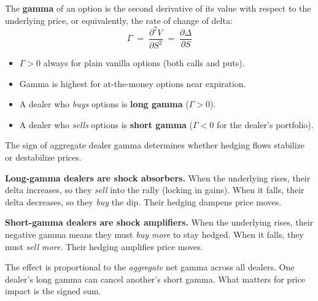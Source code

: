 \begin{definition}[Gamma]
The \textbf{gamma} of an option is the second derivative of its
value with respect to the underlying price, or equivalently, the
rate of change of delta:
\begin{equation}
\label{eq:gamma-def}
\Gamma \;=\; \frac{\partial^2 V}{\partial S^2}
  \;=\; \frac{\partial \Delta}{\partial S}
\end{equation}
\begin{itemize}[nosep]
  \item $\Gamma > 0$ always for plain vanilla options
        (both calls and puts).
  \item Gamma is highest for at-the-money options near expiration.
  \item A dealer who \emph{buys} options is \textbf{long gamma}
        ($\Gamma > 0$).
  \item A dealer who \emph{sells} options is \textbf{short gamma}
        ($\Gamma < 0$ for the dealer's portfolio).
\end{itemize}
\end{definition}

The sign of aggregate dealer gamma determines whether hedging flows
stabilize or destabilize prices.

\begin{intuition}
\textbf{Long-gamma dealers are shock absorbers.}  When the underlying
rises, their delta increases, so they \emph{sell} into the rally
(locking in gains).  When it falls, their delta decreases, so they
\emph{buy} the dip.  Their hedging dampens price moves.

\textbf{Short-gamma dealers are shock amplifiers.}  When the underlying
rises, their negative gamma means they must \emph{buy more} to stay
hedged.  When it falls, they must \emph{sell more}.  Their hedging
amplifies price moves.

The effect is proportional to the \emph{aggregate} net gamma across
all dealers.  One dealer's long gamma can cancel another's short gamma.
What matters for price impact is the signed sum.
\end{intuition}

\vspace{0.5em}


